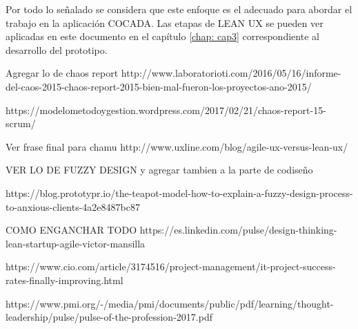 Por todo lo señalado se considera que este enfoque es el adecuado para abordar el trabajo en la aplicación COCADA. Las etapas de LEAN UX se pueden ver aplicadas en este documento en el capítulo \ref{chap: cap3} correspondiente al desarrollo del prototipo.



Agregar lo de chaos report http://www.laboratorioti.com/2016/05/16/informe-del-caos-2015-chaos-report-2015-bien-mal-fueron-los-proyectos-ano-2015/

https://modelometodoygestion.wordpress.com/2017/02/21/chaos-report-15-scrum/

Ver frase final para chamu
http://www.uxline.com/blog/agile-ux-versus-lean-ux/



VER LO DE FUZZY DESIGN y agregar tambien a la parte de codiseño

https://blog.prototypr.io/the-teapot-model-how-to-explain-a-fuzzy-design-process-to-anxious-clients-4a2e8487bc87


COMO ENGANCHAR TODO
https://es.linkedin.com/pulse/design-thinking-lean-startup-agile-victor-mansilla


https://www.cio.com/article/3174516/project-management/it-project-success-rates-finally-improving.html



https://www.pmi.org/-/media/pmi/documents/public/pdf/learning/thought-leadership/pulse/pulse-of-the-profession-2017.pdf